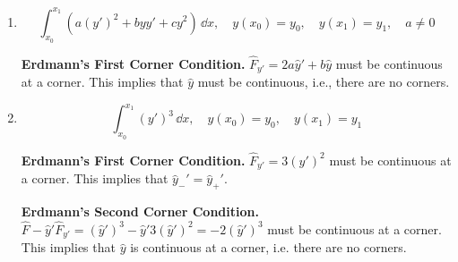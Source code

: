 \begin{Solution}
  \begin{enumerate}
  \item
    \[
    \int_{x_0}^{x_1} (a (y')^2 + b y y' + c y^2 )\,\dd x, \quad y(x_0) = y_0, \quad
    y(x_1) = y_1, \quad a \neq 0
    \]

    \textbf{Erdmann's First Corner Condition.}
    $\hat{F}_{y'} = 2 a \hat{y}' + b \hat{y}$ must be continuous at a corner.  
    This implies that $\hat{y}$ must be continuous, i.e., there are no corners.

    \begin{center}
    \end{center}
  \item
    \[
    \int_{x_0}^{x_1} (y')^3 \,\dd x, \quad y(x_0) = y_0, \quad y(x_1) = y_1
    \]

    \textbf{Erdmann's First Corner Condition.}
    $\hat{F}_{y'} = 3 (y')^2$ must be continuous at a corner.  This implies that
    $\hat{y}_-' = \hat{y}_+'$.

    \textbf{Erdmann's Second Corner Condition.}
    $\hat{F} - \hat{y}' \hat{F}_{y'} = (\hat{y}')^3 - \hat{y}' 3(\hat{y}')^2
    = -2 (\hat{y}')^3$ must be continuous at a corner.  This implies that
    $\hat{y}$ is continuous at a corner, i.e. there are no corners.

    \begin{center}
    \end{center}
  \end{enumerate}
\end{Solution}



